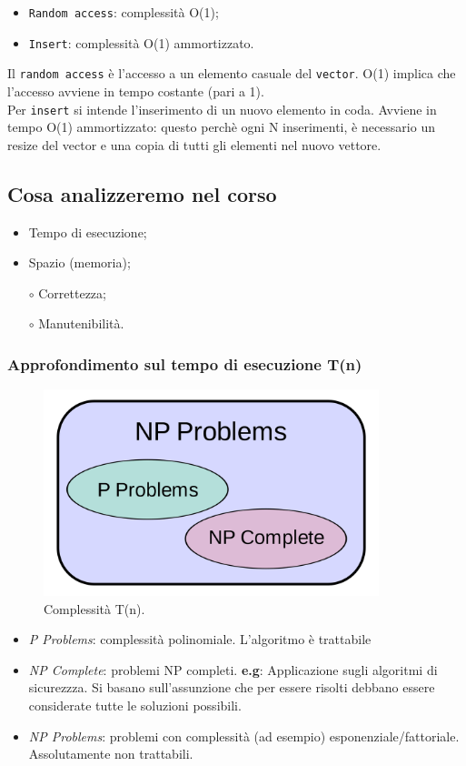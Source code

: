 \begin{itemize}
	\item \texttt{Random access}: complessità O(1);
	\item \texttt{Insert}: complessità O(1) ammortizzato.
\end{itemize}

Il \texttt{random access} è l'accesso a un elemento casuale del \texttt{vector}. O(1) implica che l'accesso avviene in tempo costante (pari a 1). \\
Per \texttt{insert} si intende l'inserimento di un nuovo elemento in coda. Avviene in tempo O(1) ammortizzato: questo perchè ogni N inserimenti, è necessario un resize del vector e una copia di tutti gli elementi nel nuovo vettore.

\subsection{Cosa analizzeremo nel corso}

\begin{itemize}
	\item Tempo di esecuzione;
	\item Spazio (memoria);
	\medskip
	\item[$\circ$] Correttezza;
	\item[$\circ$] Manutenibilità.
\end{itemize}

\subsubsection{Approfondimento sul tempo di esecuzione T(n)}

\begin{figure}[htb]
	\centering
	\includegraphics[height=6cm]{img/algorithm_complexity.png}
	\caption{Complessità T(n).}	
\end{figure}

\begin{itemize}
	\item \textit{P Problems}: complessità polinomiale. L'algoritmo è trattabile
	\item \textit{NP Complete}: problemi NP completi. \textbf{e.g}: Applicazione sugli algoritmi di sicurezzza. Si basano sull'assunzione che per essere risolti debbano essere considerate tutte le soluzioni possibili.
	\item \textit{NP Problems}: problemi con complessità  (ad esempio) esponenziale/fattoriale. Assolutamente non trattabili.
\end{itemize}
	
